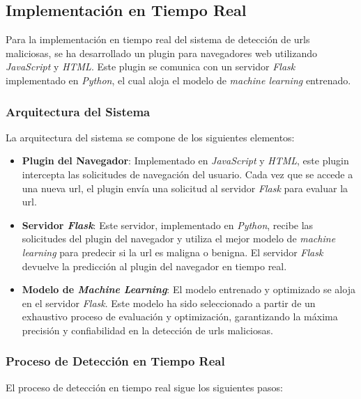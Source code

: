 \subsection{Implementación en Tiempo Real}

Para la implementación en tiempo real del sistema de detección de \glspl{url} maliciosas, se ha desarrollado un \gls{plugin} para navegadores web utilizando \textit{JavaScript} y \textit{HTML}. Este \gls{plugin} se comunica con un servidor \textit{Flask} implementado en \textit{Python}, el cual aloja el modelo de \textit{machine learning} entrenado.

\subsubsection*{Arquitectura del Sistema}

La arquitectura del sistema se compone de los siguientes elementos:

\begin{itemize}
    \item \textbf{Plugin del Navegador}: Implementado en \textit{JavaScript} y \textit{HTML}, este \gls{plugin} intercepta las solicitudes de navegación del usuario. Cada vez que se accede a una nueva \gls{url}, el \gls{plugin} envía una solicitud al servidor \textit{Flask} para evaluar la \gls{url}.

    \item \textbf{Servidor \textit{Flask}}: Este servidor, implementado en \textit{Python}, recibe las solicitudes del \gls{plugin} del navegador y utiliza el mejor modelo de \textit{machine learning} para predecir si la \gls{url} es maligna o benigna. El servidor \textit{Flask} devuelve la predicción al \gls{plugin} del navegador en tiempo real.

    \item \textbf{Modelo de \textit{Machine Learning}}: El modelo entrenado y optimizado se aloja en el servidor \textit{Flask}. Este modelo ha sido seleccionado a partir de un exhaustivo proceso de evaluación y optimización, garantizando la máxima precisión y confiabilidad en la detección de \glspl{url} maliciosas.
\end{itemize}

\subsubsection*{Proceso de Detección en Tiempo Real}

El proceso de detección en tiempo real sigue los siguientes pasos:

